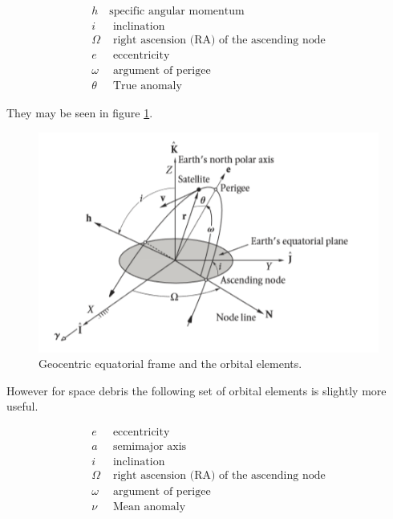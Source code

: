 \documentclass[12pt]{report}
\begin{document}
	\singlespacing
	
	\begin{eqnarray}
	h& \text{specific angular momentum}\nonumber\\
	i& \text{ inclination}\nonumber\\
	\Omega &\text{ right ascension (RA) of the ascending node}\nonumber\\
	e & \text{ eccentricity}\nonumber\\
	\omega &\text{ argument of perigee}\nonumber\\
	\theta &\text{ True anomaly}
	\end{eqnarray}
	
	They may be seen in figure \ref{fig:curtisoe}.
	
	\begin{figure}[H]
		\centering
		\includegraphics[width=0.7\linewidth]{curtis_OE}
		\caption{Geocentric equatorial frame and the orbital elements\cite{curtis2013}.}
		\label{fig:curtisoe}
	\end{figure}
	
	\doublespacing
	However for space debris the following set of orbital elements is slightly more useful. \par 
	
	\singlespacing
	
	\begin{eqnarray}
	e & \text{ eccentricity}\nonumber\\
	a & \text{ semimajor axis}\nonumber\\
	i& \text{ inclination}\nonumber\\
	\Omega &\text{ right ascension (RA) of the ascending node}\nonumber\\
	\omega &\text{ argument of perigee}\nonumber\\
	\nu &\text{ Mean anomaly}
	\end{eqnarray}
	
	\doublespacing
	
\end{document}
